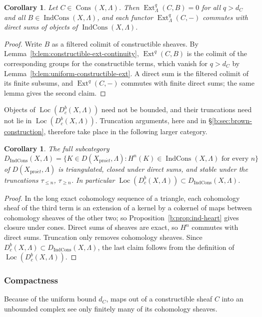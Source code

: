\documentclass[11pt,a4paper]{article}
\numberwithin{equation}{section}
\newtheorem{corollary}[theorem]{Corollary}
\theoremstyle{definition}
\theoremstyle{remark}
\newcommand{\D}{D}
\newcommand{\Dbc}{D^b_c}
\newcommand{\Loc}{\operatorname{Loc}}
\newcommand{\proet}{\mathrm{pro}\acute{e}t}
\newcommand{\Ext}{\operatorname{Ext}}
\newcommand{\Cons}{\operatorname{Cons}}
\newcommand{\IndCons}{\operatorname{IndCons}}
\newcommand{\Dic}{D_{\IndCons}}
\begin{document}
\begin{corollary}\label{b:prop:ind-heart-b}
Let $C\in\Cons(X,\Lambda)$. Then $\Ext^q_{\Lambda}(C,B)=0$ for all $q>d_C$
and all $B\in\IndCons(X,\Lambda)$, and each functor $\Ext^q_\Lambda(C,-)$
commutes with direct sums of objects of $\IndCons(X,\Lambda)$.
\end{corollary}
\begin{proof}
Write $B$ as a filtered colimit of constructible sheaves. By
Lemma~\ref{b:lem:constructible-ext-continuity}, $\Ext^q(C,B)$ is the
colimit of the corresponding groups for the constructible terms, which
vanish for $q>d_C$ by Lemma~\ref{b:lem:uniform-constructible-ext}. A
direct sum is the filtered colimit of its finite subsums, and $\Ext^q(C,-)$
commutes with finite direct sums; the same lemma gives the second claim.
\end{proof}

Objects of $\Loc(\Dbc(X,\Lambda))$ need not be bounded, and their
truncations need not lie in $\Loc(\Dbc(X,\Lambda))$. Truncation arguments,
here and in \S\ref{b:sec:brown-construction}, therefore take place in the
following larger category.

\begin{corollary}\label{b:cor:ambient-ind-derived}
The full subcategory
\[
 \Dic(X,\Lambda)
 =\{K\in\D(X_{\proet},\Lambda):H^n(K)\in\IndCons(X,\Lambda)\text{ for every }n\}
\]
of $\D(X_{\proet},\Lambda)$ is triangulated, closed under direct sums, and
stable under the truncations $\tau_{\leq n}$, $\tau_{\geq n}$. In
particular $\Loc(\Dbc(X,\Lambda))\subset\Dic(X,\Lambda)$.
\end{corollary}
\begin{proof}
In the long exact cohomology sequence of a triangle, each cohomology
sheaf of the third term is an extension of a kernel by a cokernel of maps
between cohomology sheaves of the other two; so
Proposition~\ref{b:prop:ind-heart} gives closure under cones. Direct sums
of sheaves are exact, so $H^n$ commutes with direct sums. Truncation only
removes cohomology sheaves. Since $\Dbc(X,\Lambda)\subset\Dic(X,\Lambda)$,
the last claim follows from the definition of $\Loc(\Dbc(X,\Lambda))$.
\end{proof}

\subsubsection{Compactness}

Because of the uniform bound $d_C$, maps out of a constructible sheaf
$C$ into an unbounded complex see only finitely many of its cohomology
sheaves.
\end{document}
